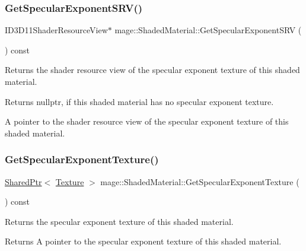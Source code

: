 \subsubsection{\texorpdfstring{Get\+Specular\+Exponent\+S\+R\+V()}{GetSpecularExponentSRV()}}
{\footnotesize\ttfamily I\+D3\+D11\+Shader\+Resource\+View$\ast$ mage\+::\+Shaded\+Material\+::\+Get\+Specular\+Exponent\+S\+RV (\begin{DoxyParamCaption}{ }\end{DoxyParamCaption}) const\hspace{0.3cm}{\ttfamily [noexcept]}}

Returns the shader resource view of the specular exponent texture of this shaded material.

\begin{DoxyReturn}{Returns}
{\ttfamily nullptr}, if this shaded material has no specular exponent texture. 

A pointer to the shader resource view of the specular exponent texture of this shaded material. 
\end{DoxyReturn}
\hypertarget{structmage_1_1_shaded_material_a0d1d76e70949caf33e30aa474882b364}{}\label{structmage_1_1_shaded_material_a0d1d76e70949caf33e30aa474882b364} 
\subsubsection{\texorpdfstring{Get\+Specular\+Exponent\+Texture()}{GetSpecularExponentTexture()}}
{\footnotesize\ttfamily \hyperlink{namespacemage_a1e01ae66713838a7a67d30e44c67703e}{Shared\+Ptr}$<$ \hyperlink{classmage_1_1_texture}{Texture} $>$ mage\+::\+Shaded\+Material\+::\+Get\+Specular\+Exponent\+Texture (\begin{DoxyParamCaption}{ }\end{DoxyParamCaption}) const\hspace{0.3cm}{\ttfamily [noexcept]}}

Returns the specular exponent texture of this shaded material.

\begin{DoxyReturn}{Returns}
A pointer to the specular exponent texture of this shaded material. 
\end{DoxyReturn}
\hypertarget{structmage_1_1_shaded_material_aa13cf6b1af3568471ebd0f93a0bc08ac}{}\label{structmage_1_1_shaded_material_aa13cf6b1af3568471ebd0f93a0bc08ac} 

